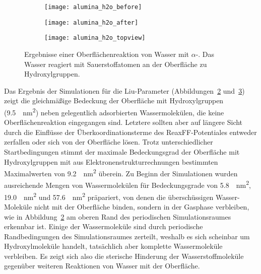 \begin{figure}
  \captionsetup[subfigure]{singlelinecheck=false}
  \def\subfigwidth{0.32\textwidth}
  \begin{subfigure}[t]{\subfigwidth}
    \texttt{[image: alumina\_h2o\_before]}
    \label{fig:wateraluminasurface-a}
  \end{subfigure}
  \hfill
  \begin{subfigure}[t]{\subfigwidth}
    \texttt{[image: alumina\_h2o\_after]}
    \label{fig:wateraluminasurface-b}
  \end{subfigure}
  \hfill
  \begin{subfigure}[t]{\subfigwidth}
    \texttt{[image: alumina\_h2o\_topview]}
    \label{fig:wateraluminasurface-c}
  \end{subfigure}
  \caption[Oberflächenreaktion von Wasser mit $\alpha$-]{Ergebnisse einer Oberflächenreaktion von Wasser mit $\alpha$-.
    Das Wasser reagiert mit Sauerstoffatomen an der Oberfläche zu Hydroxylgruppen.
  }
  \label{fig:wateraluminasurface}
\end{figure}

Das Ergebnis der Simulationen für die Liu-Parameter (Abbildungen~\ref{fig:wateraluminasurface-b} und~\ref{fig:wateraluminasurface-c}) zeigt die gleichmäßige Bedeckung der Oberfläche mit Hydroxylgruppen (\SI{9.5}{\per\square\nano\meter}) neben gelegentlich adsorbierten Wassermolekülen, die keine Oberflächenreaktion eingegangen sind.
Letztere sollten aber auf längere Sicht durch die Einflüsse der Überkoordinationsterme des ReaxFF-Potentiales entweder zerfallen oder sich von der Oberfläche lösen.
Trotz unterschiedlicher Startbedingungen stimmt der maximale Bedeckungsgrad der Oberfläche mit Hydroxylgruppen mit aus Elektronenstrukturrechnungen bestimmten Maximalwerten von \SI{9.2}{\per\square\nano\meter}\cite{kim_energy_2011} überein.
Zu Beginn der Simulationen wurden ausreichende Mengen von Wassermolekülen für Bedeckungsgrade von \SI{5.8}{\per\square\nano\meter}, \SI{19.0}{\per\square\nano\meter} und \SI{57.6}{\per\square\nano\meter} präpariert, von denen die überschüssigen Wasser-Moleküle nicht mit der Oberfläche binden, sondern in der Gasphase verbleiben, wie in Abbildung~\ref{fig:wateraluminasurface-b} am oberen Rand des periodischen Simulationsraumes erkennbar ist.
Einige der Wassermoleküle sind durch periodische Randbedingungen des Simulationsraumes zerteilt, weshalb es sich scheinbar um Hydroxylmoleküle handelt, tatsächlich aber komplette Wassermoleküle verbleiben.
Es zeigt sich also die sterische Hinderung der Wasserstoffmoleküle gegenüber weiteren Reaktionen von Wasser mit der Oberfläche.

